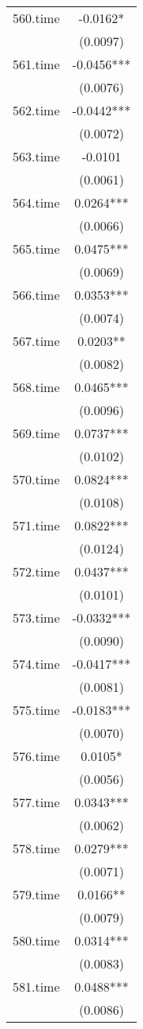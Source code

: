 \documentclass[]{article}
\begin{document}
\begin{tabular}{lc}
560.time & -0.0162* \\
 & (0.0097) \\
561.time & -0.0456*** \\
 & (0.0076) \\
562.time & -0.0442*** \\
 & (0.0072) \\
563.time & -0.0101 \\
 & (0.0061) \\
564.time & 0.0264*** \\
 & (0.0066) \\
565.time & 0.0475*** \\
 & (0.0069) \\
566.time & 0.0353*** \\
 & (0.0074) \\
567.time & 0.0203** \\
 & (0.0082) \\
568.time & 0.0465*** \\
 & (0.0096) \\
569.time & 0.0737*** \\
 & (0.0102) \\
570.time & 0.0824*** \\
 & (0.0108) \\
571.time & 0.0822*** \\
 & (0.0124) \\
572.time & 0.0437*** \\
 & (0.0101) \\
573.time & -0.0332*** \\
 & (0.0090) \\
574.time & -0.0417*** \\
 & (0.0081) \\
575.time & -0.0183*** \\
 & (0.0070) \\
576.time & 0.0105* \\
 & (0.0056) \\
577.time & 0.0343*** \\
 & (0.0062) \\
578.time & 0.0279*** \\
 & (0.0071) \\
579.time & 0.0166** \\
 & (0.0079) \\
580.time & 0.0314*** \\
 & (0.0083) \\
581.time & 0.0488*** \\
 & (0.0086) \\

\end{tabular}
\end{document}
